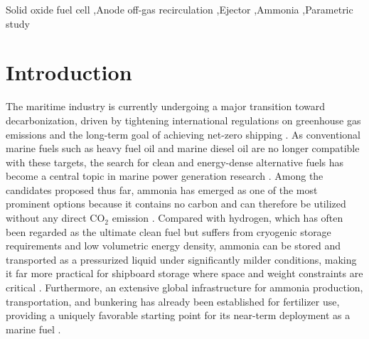 \documentclass[a4paper,10pt]{cas-dc} %
\begin{document}
\begin{keywords}
Solid oxide fuel cell \sep Anode off-gas recirculation \sep Ejector \sep Ammonia \sep Parametric study
\end{keywords}

\maketitle

\linenumbers    %
\doublespacing
{}%

\section{Introduction}

The maritime industry is currently undergoing a major transition toward decarbonization, driven by tightening international regulations on greenhouse gas emissions and the long-term goal of achieving net-zero shipping \cite{ROBALOCABRERA2025104549,IMO2023GHGStrategy}.
As conventional marine fuels such as heavy fuel oil and marine diesel oil are no longer compatible with these targets, the search for clean and energy-dense alternative fuels has become a central topic in marine power generation research \cite{ALENAZI20211962}.
Among the candidates proposed thus far, ammonia has emerged as one of the most prominent options because it contains no carbon and can therefore be utilized without any direct CO$_2$ emission \cite{su152115565}.
Compared with hydrogen, which has often been regarded as the ultimate clean fuel but suffers from cryogenic storage requirements and low volumetric energy density, ammonia can be stored and transported as a pressurized liquid under significantly milder conditions, making it far more practical for shipboard storage where space and weight constraints are critical \cite{en13123062,MCKINLAY202128282}.
Furthermore, an extensive global infrastructure for ammonia production, transportation, and bunkering has already been established for fertilizer use, providing a uniquely favorable starting point for its near-term deployment as a marine fuel \cite{Ammonfuel2020}.
\end{document}
